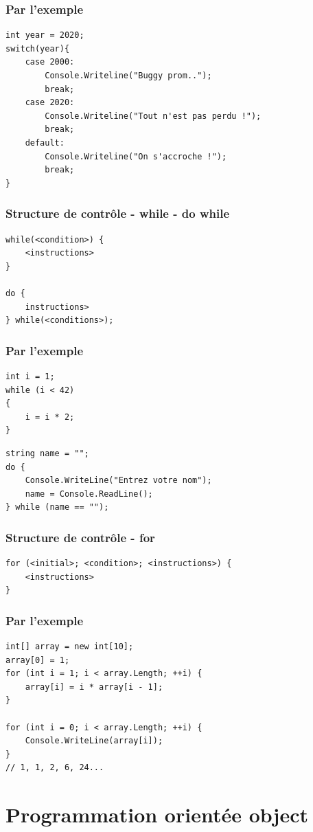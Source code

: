 \documentclass{beamer}
\begin{document}
\begin{frame}[fragile]
\frametitle{Par l'exemple}
\begin{lstlisting}
int year = 2020;
switch(year){
    case 2000:
        Console.Writeline("Buggy prom..");
        break;
    case 2020:
        Console.Writeline("Tout n'est pas perdu !");
        break;
    default:
        Console.Writeline("On s'accroche !");
        break;
}
\end{lstlisting}
\end{frame}

\begin{frame}[fragile]
\frametitle{Structure de contrôle - while - do while}
\begin{lstlisting}
while(<condition>) {
    <instructions>
}

do {
    instructions>
} while(<conditions>);
\end{lstlisting}
\end{frame}

\begin{frame}[fragile]
\frametitle{Par l'exemple}
\begin{lstlisting}
int i = 1;
while (i < 42)
{
    i = i * 2;
}
\end{lstlisting}
\begin{lstlisting}
string name = "";
do {
    Console.WriteLine("Entrez votre nom");
    name = Console.ReadLine();
} while (name == "");
\end{lstlisting}
\end{frame}

\begin{frame}[fragile]
\frametitle{Structure de contrôle - for}
\begin{lstlisting}
for (<initial>; <condition>; <instructions>) {
    <instructions>
}
\end{lstlisting}
\end{frame}

\begin{frame}[fragile]
\frametitle{Par l'exemple}
\begin{lstlisting}
int[] array = new int[10];
array[0] = 1;
for (int i = 1; i < array.Length; ++i) {
    array[i] = i * array[i - 1];
}

for (int i = 0; i < array.Length; ++i) {
    Console.WriteLine(array[i]);
}
// 1, 1, 2, 6, 24...
\end{lstlisting}
\end{frame}

\section{Programmation orientée object}
\end{document}
